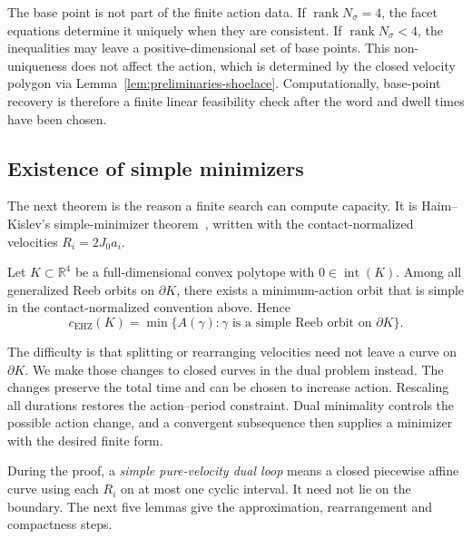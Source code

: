 \begin{remark}
The base point is not part of the finite action data. If
\(\operatorname{rank}N_\sigma=4\), the facet equations determine it uniquely
when they are consistent. If \(\operatorname{rank}N_\sigma<4\), the inequalities
may leave a positive-dimensional set of base points. This non-uniqueness does
not affect the action, which is determined by the closed velocity polygon via
Lemma~\ref{lem:preliminaries-shoelace}. Computationally, base-point recovery is
therefore a finite linear feasibility check after the word and dwell times have
been chosen.
\end{remark}

\subsection{Existence of simple minimizers}
\label{subsec:generalized-reeb-orbits-polytopes-existence-of-simple-minimizers}

The next theorem is the reason a finite search can compute capacity.
It is Haim--Kislev's simple-minimizer theorem~\cite[Theorem~1.5]{HK2017},
written with the contact-normalized velocities $R_i=2J_0a_i$.

\begin{theorem}\label{thm:generalized-reeb-simple-minimizer}
Let \(K\subset\mathbb{R}^4\) be a full-dimensional convex polytope with
\(0\in\operatorname{int}(K)\). Among all generalized Reeb orbits on
\(\partial K\), there exists a minimum-action orbit that is simple in the
contact-normalized convention above. Hence
\[
  c_{\mathrm{EHZ}}(K)
  =
  \min\{A(\gamma):\gamma
  \text{ is a simple Reeb orbit on }\partial K\}.
\]
\end{theorem}

The difficulty is that splitting or rearranging velocities need not leave
a curve on $\partial K$. We make those changes to closed curves in the dual
problem instead. The changes preserve the total time and can be chosen to
increase action. Rescaling all durations restores the action--period
constraint. Dual minimality controls the possible action change, and a
convergent subsequence then supplies a minimizer with the desired finite form.

During the proof, a \emph{simple pure-velocity dual loop} means a closed
piecewise affine curve using each $R_i$ on at most one cyclic interval.
It need not lie on the boundary. The next five lemmas give the approximation,
rearrangement and compactness steps.


